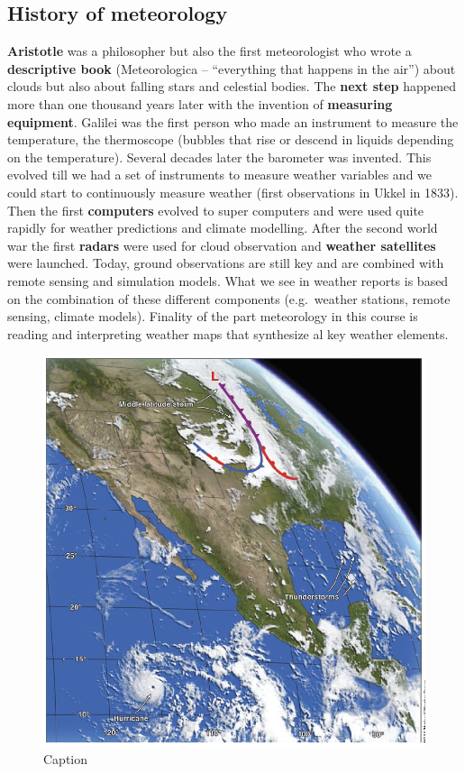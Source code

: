\documentclass[oneside]{book}
\begin{document}
\subsection{History of meteorology}\label{history-of-meteorology}

\textbf{Aristotle} was a philosopher but also the first meteorologist
who wrote a \textbf{descriptive book} (Meteorologica -- ``everything
that happens in the air'') about clouds but also about falling stars and
celestial bodies. The \textbf{next step} happened more than one thousand
years later with the invention of \textbf{measuring equipment}. Galilei
was the first person who made an instrument to measure the temperature,
the thermoscope (bubbles that rise or descend in liquids depending on
the temperature). Several decades later the barometer was invented. This
evolved till we had a set of instruments to measure weather variables
and we could start to continuously measure weather (first observations
in Ukkel in 1833). Then the first \textbf{computers} evolved to super
computers and were used quite rapidly for weather predictions and
climate modelling. After the second world war the first \textbf{radars}
were used for cloud observation and \textbf{weather satellites} were
launched. Today, ground observations are still key and are combined with
remote sensing and simulation models. What we see in weather reports is
based on the combination of these different components (e.g.~weather
stations, remote sensing, climate models). Finality of the part
meteorology in this course is reading and interpreting weather maps that
synthesize al key weather elements.

\begin{figure}

{\centering \includegraphics[width=0.5\linewidth]{figures/Figure17} 

}

\caption{Caption}\label{fig:History1}
\end{figure}
\end{document}
